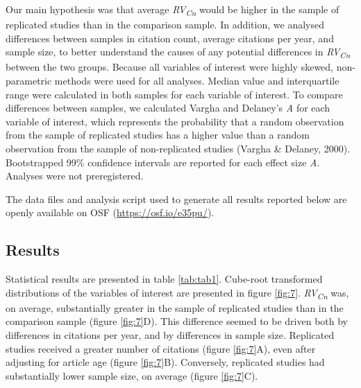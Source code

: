 \documentclass[
  english,
  jou,floatsintext]{apa6}
\begin{document}
Our main hypothesis was that average \emph{RV\textsubscript{Cn}} would be higher in the sample of replicated studies than in the comparison sample. In addition, we analysed differences between samples in citation count, average citations per year, and sample size, to better understand the causes of any potential differences in \emph{RV\textsubscript{Cn}} between the two groups. Because all variables of interest were highly skewed, non-parametric methods were used for all analyses. Median value and interquartile range were calculated in both samples for each variable of interest. To compare differences between samples, we calculated Vargha and Delaney's \emph{A} for each variable of interest, which represents the probability that a random observation from the sample of replicated studies has a higher value than a random observation from the sample of non-replicated studies (Vargha \& Delaney, 2000). Bootstrapped 99\% confidence intervals are reported for each effect size \emph{A}. Analyses were not preregistered.

The data files and analysis script used to generate all results reported below are openly available on OSF (\url{https://osf.io/e35pu/}).

\hypertarget{results}{%
\subsection{Results}\label{results}}

Statistical results are presented in table \ref{tab:tab1}. Cube-root transformed distributions of the variables of interest are presented in figure \ref{fig:7}. \emph{RV\textsubscript{Cn}} was, on average, substantially greater in the sample of replicated studies than in the comparison sample (figure \ref{fig:7}D). This difference seemed to be driven both by differences in citations per year, and by differences in sample size. Replicated studies received a greater number of citations (figure \ref{fig:7}A), even after adjusting for article age (figure \ref{fig:7}B). Conversely, replicated studies had substantially lower sample size, on average (figure \ref{fig:7}C).
\end{document}

